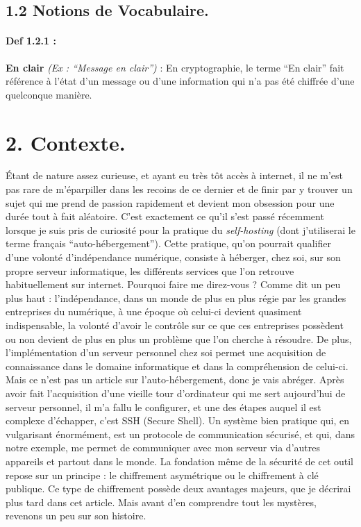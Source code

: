 \documentclass[
  paper=a4,
  ,captions=tableheading
]{scrartcl}
\begin{document}
\subsection{1.2 Notions de Vocabulaire.}\label{notions-de-vocabulaire.}

\paragraph{Def 1.2.1 :}\label{def-1.2.1}

\textbf{En clair} \emph{(Ex : ``Message en clair'')} : En cryptographie,
le terme ``En clair'' fait référence à l'état d'un message ou d'une
information qui n'a pas été chiffrée d'une quelconque manière.

\section{2. Contexte.}\label{contexte.}

Étant de nature assez curieuse, et ayant eu très tôt accès à internet,
il ne m'est pas rare de m'éparpiller dans les recoins de ce dernier et
de finir par y trouver un sujet qui me prend de passion rapidement et
devient mon obsession pour une durée tout à fait aléatoire. C'est
exactement ce qu'il s'est passé récemment lorsque je suis pris de
curiosité pour la pratique du \emph{self-hosting} (dont j'utiliserai le
terme français ``auto-hébergement''). Cette pratique, qu'on pourrait
qualifier d'une volonté d'indépendance numérique, consiste à héberger,
chez soi, sur son propre serveur informatique, les différents services
que l'on retrouve habituellement sur internet. Pourquoi faire me
direz-vous ? Comme dit un peu plus haut : l'indépendance, dans un monde
de plus en plus régie par les grandes entreprises du numérique, à une
époque où celui-ci devient quasiment indispensable, la volonté d'avoir
le contrôle sur ce que ces entreprises possèdent ou non devient de plus
en plus un problème que l'on cherche à résoudre. De plus,
l'implémentation d'un serveur personnel chez soi permet une acquisition
de connaissance dans le domaine informatique et dans la compréhension de
celui-ci. Mais ce n'est pas un article sur l'auto-hébergement, donc je
vais abréger. Après avoir fait l'acquisition d'une vieille tour
d'ordinateur qui me sert aujourd'hui de serveur personnel, il m'a fallu
le configurer, et une des étapes auquel il est complexe d'échapper,
c'est SSH (Secure Shell). Un système bien pratique qui, en vulgarisant
énormément, est un protocole de communication sécurisé, et qui, dans
notre exemple, me permet de communiquer avec mon serveur via d'autres
appareils et partout dans le monde. La fondation même de la sécurité de
cet outil repose sur un principe : le chiffrement asymétrique ou le
chiffrement à clé publique. Ce type de chiffrement possède deux
avantages majeurs, que je décrirai plus tard dans cet article. Mais
avant d'en comprendre tout les mystères, revenons un peu sur son
histoire.
\end{document}
